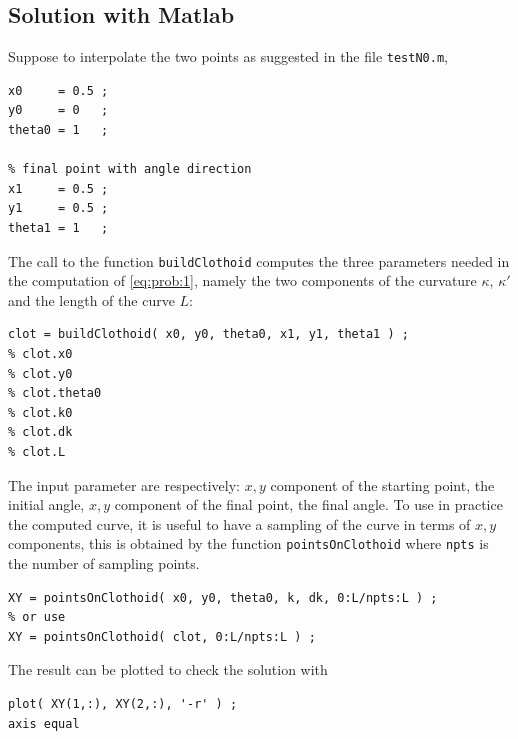 \documentclass[preprint,3p]{elsarticle}
\begin{document}
\subsection{Solution with Matlab}
Suppose to interpolate the two points as suggested in the file \texttt{testN0.m},
\begin{lstlisting}[breaklines, backgroundcolor=\color{gray!10},basicstyle=\small\ttfamily]
% initial point with angle direction
x0     = 0.5 ;
y0     = 0   ;
theta0 = 1   ;

% final point with angle direction
x1     = 0.5 ;
y1     = 0.5 ;
theta1 = 1   ;
\end{lstlisting}
The call to the function \texttt{buildClothoid} computes the three parameters needed in the computation of \eqref{eq:prob:1}, namely the two components of the curvature $\kappa$, $\kappa'$ and the length of the curve $L$:
\begin{lstlisting}[breaklines, backgroundcolor=\color{gray!10},basicstyle=\small\ttfamily]
% compute clothoid parameters
clot = buildClothoid( x0, y0, theta0, x1, y1, theta1 ) ;
% clot.x0
% clot.y0
% clot.theta0
% clot.k0
% clot.dk
% clot.L
\end{lstlisting}
The input parameter are respectively: $x,y$ component of the starting point, the initial angle, $x,y$ component of the final point, the final angle.
To use in practice the computed curve, it is useful to have a sampling of the curve in terms of $x,y$ components, this is obtained by the function \texttt{pointsOnClothoid} where \texttt{npts} is the number of sampling points.
\begin{lstlisting}[breaklines, backgroundcolor=\color{gray!10},basicstyle=\small\ttfamily]
% compute points on clothoid
XY = pointsOnClothoid( x0, y0, theta0, k, dk, 0:L/npts:L ) ;
% or use
XY = pointsOnClothoid( clot, 0:L/npts:L ) ;
\end{lstlisting}
The result can be plotted to check the solution with
\begin{lstlisting}[breaklines, backgroundcolor=\color{gray!10},basicstyle=\small\ttfamily]
% plot solution
plot( XY(1,:), XY(2,:), '-r' ) ;
axis equal
\end{lstlisting}
\end{document}
